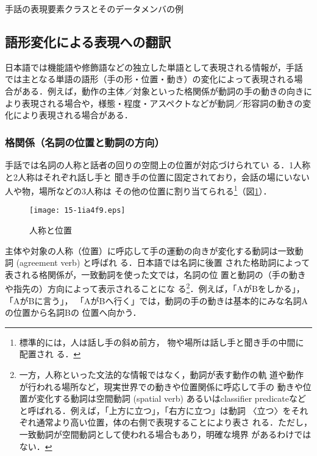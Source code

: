 \documentclass[japanese]{jnlp_1.4}
\begin{document}
\begin{table}[t]
  \caption{手話の表現要素クラスとそのデータメンバの例}
  \label{tab:member}

\end{table}



\subsection{語形変化による表現への翻訳}
\label{sec:param}

日本語では機能語や修飾語などの独立した単語として表現される情報が，手話
では主となる単語の語形（手の形・位置・動き）の変化によって表現される場
合がある．例えば，動作の主体／対象といった格関係が動詞の手の動きの向きに
より表現される場合や，様態・程度・アスペクトなどが動詞／形容詞の動きの変
化により表現される場合がある．



\subsubsection{格関係（名詞の位置と動詞の方向）}
\label{sec:case-relation}

手話では名詞の人称と話者の回りの空間上の位置が対応づけられてい
る\cite{Matsumoto2001,Baker-Shenk1980}．1人称と2人称はそれぞれ話し手と
聞き手の位置に固定されており，会話の場にいない人や物，場所などの3人称は
その他の位置に割り当てられる\footnote{標準的には，人は話し手の斜め前方，
  物や場所は話し手と聞き手の中間に配置され
  る\cite{Matsumoto2001}．}（図\ref{fig:personalLocations}）．

\begin{figure}[b]
  \centering
      \texttt{[image: 15-1ia4f9.eps]}
  \caption{人称と位置}
  \label{fig:personalLocations}
\end{figure}

主体や対象の人称（位置）に呼応して手の運動の向きが変化する動詞は一致動
詞 (agreement verb) と呼ばれ
る\cite{Ichida1999,Sutton-Spence1999,Sandler2006}．日本語では名詞に後置
された格助詞によって表される格関係が，一致動詞を使った文では，名詞の位
置と動詞の（手の動きや指先の）方向によって表示されることにな
る\footnote{一方，人称といった文法的な情報ではなく，動詞が表す動作の軌
  道や動作が行われる場所など，現実世界での動きや位置関係に呼応して手の
  動きや位置が変化する動詞は空間動詞 (spatial verb) あるいはclassifier
  predicateなどと呼ばれる．例えば，「上方に立つ」，「右方に立つ」は動詞
  〈立つ〉をそれぞれ通常より高い位置，体の右側で表現することにより表さ
  れる．ただし，一致動詞が空間動詞として使われる場合もあり，明確な境界
  があるわけではない．}．例えば，「AがBをしかる」，「AがBに言う」，
「AがBへ行く」では，動詞の手の動きは基本的にみな名詞Aの位置から名詞Bの
位置へ向かう．
\end{document}
